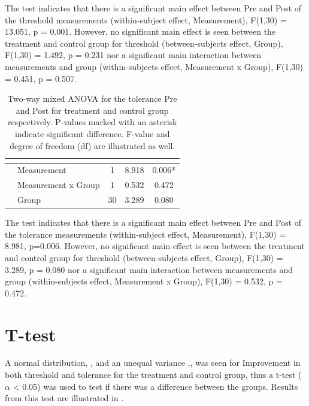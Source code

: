 The test indicates that there is a significant main effect between Pre and Post of the threshold measurements (within-subject effect, Measurement), F(1,30) = 13.051, p = 0.001. However, no significant main effect is seen between the treatment and control group for threshold (between-subjects effect, Group), F(1,30) = 1.492, p = 0.231 nor a significant main interaction between measurements and group (within-subjects effect, Measurement x Group), F(1,30) = 0.451, p = 0.507. 
 
\begin{longtable} {l|l|c|c|c}
\caption{Two-way mixed ANOVA for the tolerance Pre and Post for treatment and control group respectively. P-values marked with an asterisk indicate significant difference. F-value and degree of freedom (df) are illustrated as well.}
	\label{tab:ANOVA2} \\
  \cellcolor[HTML]{C0C0C0}{} &  \cellcolor[HTML]{C0C0C0}{} & \multicolumn{1}{c|}{ \cellcolor[HTML]{C0C0C0}{\textbf{df}}} &
 \multicolumn{1}{c|}{ \cellcolor[HTML]{C0C0C0}{\textbf{F}}} & \multicolumn{1}{c}{ \cellcolor[HTML]{C0C0C0}{\textbf{Sig}}} \\ \hline  
\cellcolor[HTML]{C0C0C0} & Measurement & 1 & 8.918 & 0.006*  \\ \cline{2-5}
\cellcolor[HTML]{C0C0C0}\multirow{-2}{*}{\textbf{Within-Subjects effect}} & Measurement x Group & 1 & 0.532 & 0.472  \\ \hline
\cellcolor[HTML]{C0C0C0}{\textbf{Between-Subjects effect}} & Group & 30 & 3.289 & 0.080  \\ \hline
\end{longtable}
\vspace{-.5cm}

The test indicates that there is a significant main effect between Pre and Post of the tolerance measurements (within-subject effect, Measurement), F(1,30) = 8.981, p=0.006. However, no significant main effect is seen between the treatment and control group for threshold (between-subjects effect, Group), F(1,30) = 3.289, p = 0.080 nor a significant main interaction between  measurements and group (within-subjects effect, Measurement x Group), F(1,30) = 0.532, p = 0.472. 

\section{T-test}
A normal distribution, , and an unequal variance ,, was seen for Improvement in both threshold and tolerance for the treatment and control group, thus a t-test ($\alpha$ < 0.05) was used to test if there was a difference between the groups. Results from this test are illustrated in .

